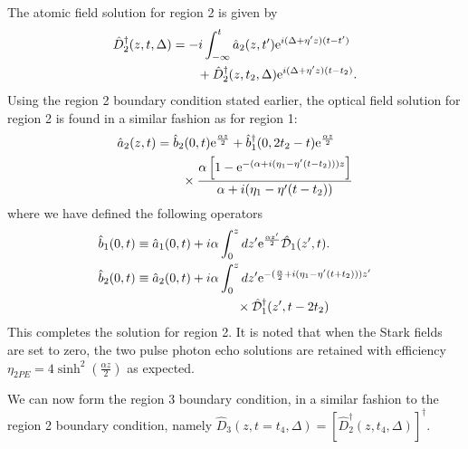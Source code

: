\documentclass[superscriptaddress,pra,twocolumn,showpacs,amsmath,amssymb,aps,a4paper]{revtex4}
\begin{document}
 The atomic field solution for region 2 is given by
 \begin{align}
 \hat{D}^\dagger_2(z,t,\Delta) &= -i\int^t_{-\infty}\hat{a}_2(z,t')\text{e}^{i(\Delta+\eta' z)(t-t')}\notag \\
 & \qquad+ \hat{D}^{\dagger}_2(z,t_2,\Delta)\text{e}^{i(\Delta + \eta' z)(t-t_2)}.
 \end{align}
Using the region 2 boundary condition stated earlier, the optical field solution for region 2 is found in a similar fashion as for region 1:
\begin{align}
\hat{a}_2(z,t) &= \hat{b}_2(0,t)\text{e}^{\frac{\alpha z}{2}} + \hat{b}^\dagger_1(0,2t_2-t) \text{e}^{\frac{\alpha z}{2}} \notag \\
&\qquad \times \frac{\alpha \left[ 1 - \text{e}^{-(\alpha + i(\eta_1 - \eta' (t-t_2)))z}\right]}{\alpha +i (\eta_1 - \eta'(t-t_2))} 
\end{align}
where we have defined the following operators 
\begin{align}
\hat{b}_1(0,t) &\equiv \hat{a}_1(0,t) + i\alpha \int^z_0 dz' \text{e}^{\frac{\alpha z'}{2}} \hat{\mathcal{D}}_1(z',t) .\notag \\
\hat{b}_2(0,t) &\equiv \hat{a}_2(0,t) + i\alpha\int^z_0 dz' \text{e}^{-(\frac{\alpha}{2} + i(\eta_1 - \eta' (t +t_2)))z'} \notag \\
& \qquad\qquad\qquad\qquad \times\hat{\mathcal{D}}^\dagger_1(z',t-2t_2) \notag  
\end{align}
This completes the solution for region 2. It is noted that when the Stark fields are set to zero, the two pulse photon echo solutions are retained with efficiency $\eta_{2PE} = 4\sinh^2(\frac{\alpha z}{2})$ as expected.

We can now form the region 3 boundary condition, in a similar fashion to the region 2 boundary condition, namely $\hat{D}_3(z,t = t_4,\Delta) = \left[ \hat{D}^\dagger_2(z,t_4,\Delta) \right]^{\dagger}$.
\end{document}
